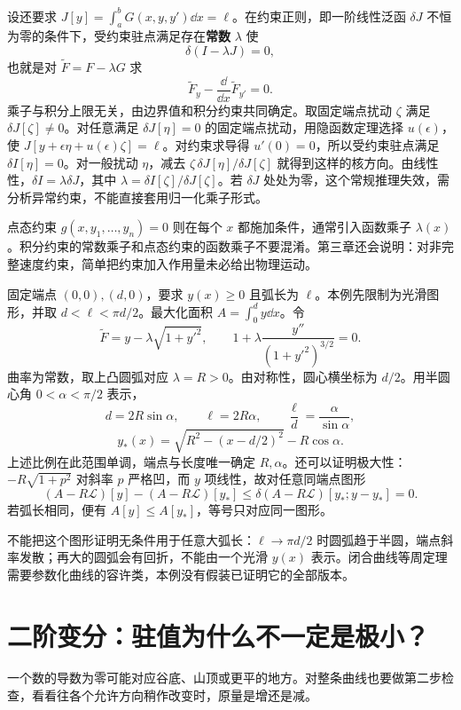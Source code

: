 设还要求 $J[y]=\int_a^bG(x,y,y')\dd x=\ell$。在约束正则，即一阶线性泛函 $\delta J$ 不恒为零的条件下，受约束驻点满足存在\textbf{常数} $\lambda$ 使
\begin{equation}\label{eq:lagrange-multiplier}
\delta(I-\lambda J)=0,
\end{equation}
也就是对 $\widetilde F=F-\lambda G$ 求
\begin{equation}\label{eq:constrained-el}
\widetilde F_y-\frac{\dd}{\dd x}\widetilde F_{y'}=0.
\end{equation}
乘子与积分上限无关，由边界值和积分约束共同确定。取固定端点扰动 $\zeta$ 满足 $\delta J[\zeta]\ne0$。对任意满足 $\delta J[\eta]=0$ 的固定端点扰动，用隐函数定理选择 $u(\epsilon)$，使 $J[y+\epsilon\eta+u(\epsilon)\zeta]=\ell$。对约束求导得 $u'(0)=0$，所以受约束驻点满足 $\delta I[\eta]=0$。对一般扰动 $\eta$，减去 $\zeta\,\delta J[\eta]/\delta J[\zeta]$ 就得到这样的核方向。由线性性，$\delta I=\lambda\delta J$，其中 $\lambda=\delta I[\zeta]/\delta J[\zeta]$。若 $\delta J$ 处处为零，这个常规推理失效，需分析异常约束，不能直接套用归一化乘子形式。

点态约束 $g(x,y_1,\ldots,y_n)=0$ 则在每个 $x$ 都施加条件，通常引入函数乘子 $\lambda(x)$。积分约束的常数乘子和点态约束的函数乘子不要混淆。第三章还会说明：对非完整速度约束，简单把约束加入作用量未必给出物理运动。

\begin{example}
固定端点 $(0,0),(d,0)$，要求 $y(x)\ge0$ 且弧长为 $\ell$。本例先限制为光滑图形，并取 $d<\ell<\pi d/2$。最大化面积 $A=\int_0^dy\dd x$。令
\[
\widetilde F=y-\lambda\sqrt{1+y'^2},
\qquad
1+\lambda\frac{y''}{(1+y'^2)^{3/2}}=0.
\]
曲率为常数，取上凸圆弧对应 $\lambda=R>0$。由对称性，圆心横坐标为 $d/2$。用半圆心角 $0<\alpha<\pi/2$ 表示，
\[
d=2R\sin\alpha,\qquad \ell=2R\alpha,\qquad
\frac\ell d=\frac\alpha{\sin\alpha},
\]
\[
y_*(x)=\sqrt{R^2-(x-d/2)^2}-R\cos\alpha.
\]
上述比例在此范围单调，端点与长度唯一确定 $R,\alpha$。还可以证明极大性：$-R\sqrt{1+p^2}$ 对斜率 $p$ 严格凹，而 $y$ 项线性，故对任意同端点图形
\[
(A-R\mathcal L)[y]-(A-R\mathcal L)[y_*]
\le\delta(A-R\mathcal L)[y_*;y-y_*]=0.
\]
若弧长相同，便有 $A[y]\le A[y_*]$，等号只对应同一图形。

不能把这个图形证明无条件用于任意大弧长：$\ell\to\pi d/2$ 时圆弧趋于半圆，端点斜率发散；再大的圆弧会有回折，不能由一个光滑 $y(x)$ 表示。闭合曲线等周定理需要参数化曲线的容许类，本例没有假装已证明它的全部版本。
\end{example}

\section{二阶变分：驻值为什么不一定是极小？}
一个数的导数为零可能对应谷底、山顶或更平的地方。对整条曲线也要做第二步检查，看看往各个允许方向稍作改变时，原量是增还是减。

